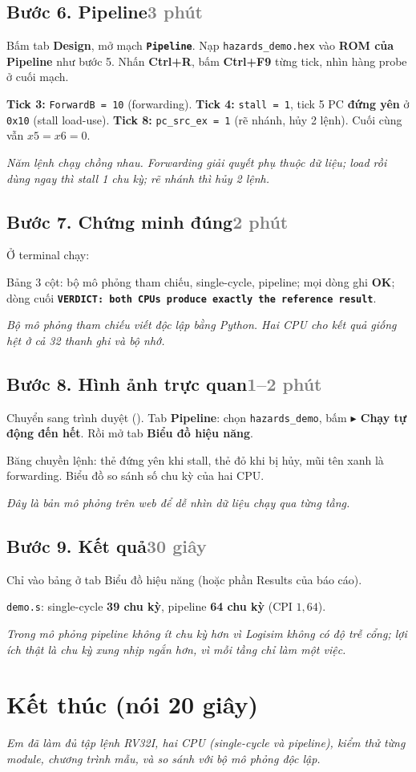 \documentclass[11pt,a4paper]{article}
\newcommand{\p}[1]{\texttt{\detokenize{#1}}}
\newcommand{\lamgi}[1]{\item[\textbf{Làm gì:}] #1}
\newcommand{\xemgi}[1]{\item[\textbf{Cho thầy xem:}] #1}
\newcommand{\noigi}[1]{\item[\textbf{Nói:}] \emph{#1}}
\newenvironment{buoc}[2]{%
  \subsection*{#1\hfill\normalfont\small\textcolor{gray}{#2}}
  \begin{description}[leftmargin=2.8cm,style=sameline,labelwidth=2.6cm]}{\end{description}}
\begin{document}
\begin{buoc}{Bước 6. Pipeline}{3 phút}
  \lamgi{Bấm tab \textbf{Design}, mở mạch \textbf{\texttt{Pipeline}}. Nạp \texttt{hazards\_demo.hex} vào \textbf{ROM của Pipeline} như bước 5. Nhấn \textbf{Ctrl+R}, bấm \textbf{Ctrl+F9} từng tick, nhìn hàng probe ở cuối mạch.}
  \xemgi{\textbf{Tick 3:} \texttt{ForwardB = 10} (forwarding). \textbf{Tick 4:} \texttt{stall = 1}, tick 5 PC \textbf{đứng yên} ở \texttt{0x10} (stall load-use). \textbf{Tick 8:} \texttt{pc\_src\_ex = 1} (rẽ nhánh, hủy 2 lệnh). Cuối cùng vẫn $x5=x6=0$.}
  \noigi{Năm lệnh chạy chồng nhau. Forwarding giải quyết phụ thuộc dữ liệu; load rồi dùng ngay thì stall 1 chu kỳ; rẽ nhánh thì hủy 2 lệnh.}
\end{buoc}

\begin{buoc}{Bước 7. Chứng minh đúng}{2 phút}
  \lamgi{Ở terminal chạy: \p{python tools\live_proof.py}}
  \xemgi{Bảng 3 cột: bộ mô phỏng tham chiếu, single-cycle, pipeline; mọi dòng ghi \textbf{OK}; dòng cuối \textbf{\texttt{VERDICT: both CPUs produce exactly the reference result}}.}
  \noigi{Bộ mô phỏng tham chiếu viết độc lập bằng Python. Hai CPU cho kết quả giống hệt ở cả 32 thanh ghi và bộ nhớ.}
\end{buoc}

\begin{buoc}{Bước 8. Hình ảnh trực quan}{1--2 phút}
  \lamgi{Chuyển sang trình duyệt (\p{docs\web\index.html}). Tab \textbf{Pipeline}: chọn \texttt{hazards\_demo}, bấm \textbf{$\blacktriangleright$ Chạy tự động đến hết}. Rồi mở tab \textbf{Biểu đồ hiệu năng}.}
  \xemgi{Băng chuyền lệnh: thẻ đứng yên khi stall, thẻ đỏ khi bị hủy, mũi tên xanh là forwarding. Biểu đồ so sánh số chu kỳ của hai CPU.}
  \noigi{Đây là bản mô phỏng trên web để dễ nhìn dữ liệu chạy qua từng tầng.}
\end{buoc}

\begin{buoc}{Bước 9. Kết quả}{30 giây}
  \lamgi{Chỉ vào bảng ở tab Biểu đồ hiệu năng (hoặc phần Results của báo cáo).}
  \xemgi{\texttt{demo.s}: single-cycle \textbf{39 chu kỳ}, pipeline \textbf{64 chu kỳ} (CPI $1{,}64$).}
  \noigi{Trong mô phỏng pipeline không ít chu kỳ hơn vì Logisim không có độ trễ cổng; lợi ích thật là chu kỳ xung nhịp ngắn hơn, vì mỗi tầng chỉ làm một việc.}
\end{buoc}

\section{Kết thúc (nói 20 giây)}
\emph{Em đã làm đủ tập lệnh RV32I, hai CPU (single-cycle và pipeline), kiểm thử từng module, chương trình mẫu, và so sánh với bộ mô phỏng độc lập.}
\end{document}
